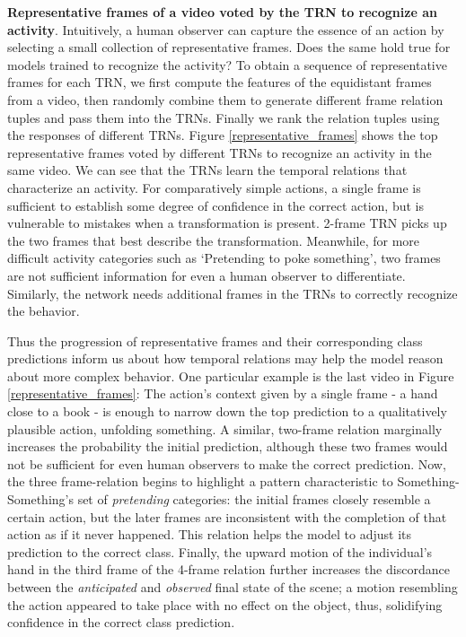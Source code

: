 \documentclass[runningheads]{llncs}
\begin{document}
\textbf{Representative frames of a video voted by the TRN to recognize an activity}.  Intuitively, a human observer can capture the essence of an action by selecting a small collection of representative frames. Does the same hold true for models trained to recognize the activity? To obtain a sequence of representative frames for each TRN, we first compute the features of the equidistant frames from a video, then randomly combine them to generate different frame relation tuples and pass them into the TRNs. Finally we rank the relation tuples using the responses of different TRNs. Figure \ref{representative_frames} shows the top representative frames voted by different TRNs to recognize an activity in the same video. We can see that the TRNs learn the temporal relations that characterize an activity. For comparatively simple actions, a single frame is sufficient to establish some degree of confidence in the correct action, but is vulnerable to mistakes when a transformation is present. 2-frame TRN picks up the two frames that best describe the transformation. Meanwhile, for more difficult activity categories such as `Pretending to poke something', two frames are not sufficient information for even a human observer to differentiate. Similarly, the network needs additional frames in the TRNs to correctly recognize the behavior.

Thus the progression of representative frames and their corresponding class predictions inform us about how temporal relations may help the model reason about more complex behavior. One particular example is the last video in Figure \ref{representative_frames}:
The action's context given by a single frame - a hand close to a book - is enough to narrow down the top prediction to a qualitatively plausible action, unfolding something. A similar, two-frame relation marginally increases the probability the initial prediction, although these two frames would not be sufficient for even human observers to make the correct prediction.
Now, the three frame-relation begins to highlight a pattern characteristic to Something-Something’s set of \emph{pretending} categories: the initial frames closely resemble a certain action, but the later frames are inconsistent with the completion of that action as if it never happened. This relation helps the model to adjust its prediction to the correct class. Finally, the upward motion of the individual’s hand in the third frame of the 4-frame relation further increases the discordance between the \emph{anticipated} and \emph{observed} final state of the scene; a motion resembling the action appeared to take place with no effect on the object, thus, solidifying confidence in the correct class prediction.
\end{document}
